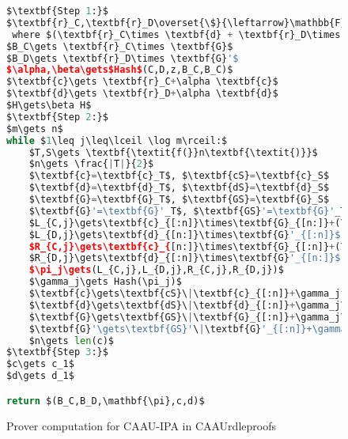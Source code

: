 \begin{figure}[ht]\label{fig:ipa-prover}
\begin{framed}
\begin{lstlisting}[language=Python,mathescape=true,label={lst:ipa-prover}]
$\textbf{Step 1:}$
$\textbf{r}_C,\textbf{r}_D\overset{\$}{\leftarrow}\mathbb{F}^n$
 where $(\textbf{r}_C\times \textbf{d} + \textbf{r}_D\times \textbf{c})=0\text{ and }\textbf{r}_C\times \textbf{r}_D=0$
$B_C\gets \textbf{r}_C\times \textbf{G}$
$B_D\gets \textbf{r}_D\times \textbf{G}'$
$\alpha,\beta\gets$Hash$(C,D,z,B_C,B_C)$
$\textbf{c}\gets \textbf{r}_C+\alpha \textbf{c}$
$\textbf{d}\gets \textbf{r}_D+\alpha \textbf{d}$
$H\gets\beta H$
$\textbf{Step 2:}$
$m\gets n$
while $1\leq j\leq\lceil \log m\rceil:$
    $T,S\gets \textbf{\textit{f(}}n\textbf{\textit{)}}$
    $n\gets \frac{|T|}{2}$
    $\textbf{c}=\textbf{c}_T$, $\textbf{cS}=\textbf{c}_S$
    $\textbf{d}=\textbf{d}_T$, $\textbf{dS}=\textbf{d}_S$
    $\textbf{G}=\textbf{G}_T$, $\textbf{GS}=\textbf{G}_S$
    $\textbf{G}'=\textbf{G}'_T$, $\textbf{GS}'=\textbf{G}'_T$
    $L_{C,j}\gets\textbf{c}_{[:n]}\times\textbf{G}_{[n:]}+(\textbf{c}_{[:n]}\times\textbf{d}_{[n:]})H$
    $L_{D,j}\gets\textbf{d}_{[n:]}\times\textbf{G}'_{[:n]}$
    $R_{C,j}\gets\textbf{c}_{[n:]}\times\textbf{G}_{[:n]}+(\textbf{c}_{[n:]}\times\textbf{d}_{[:n]})H$
    $R_{D,j}\gets\textbf{d}_{[:n]}\times\textbf{G}'_{[n:]}$
    $\pi_j\gets(L_{C,j},L_{D,j},R_{C,j},R_{D,j})$
    $\gamma_j\gets Hash(\pi_j)$
    $\textbf{c}\gets\textbf{cS}\|\textbf{c}_{[:n]}+\gamma_j^{-1}\textbf{c}_{[n:]}$
    $\textbf{d}\gets\textbf{dS}\|\textbf{d}_{[:n]}+\gamma_j\textbf{d}_{[n:]}$
    $\textbf{G}\gets\textbf{GS}\|\textbf{G}_{[:n]}+\gamma_j\textbf{G}_{[n:]}$
    $\textbf{G}'\gets\textbf{GS}'\|\textbf{G}'_{[:n]}+\gamma_j^{-1}\textbf{G}'_{[n:]}$
    $n\gets len(c)$
$\textbf{Step 3:}$
$c\gets c_1$
$d\gets d_1$

return $(B_C,B_D,\mathbf{\pi},c,d)$
\end{lstlisting}
\end{framed}
\caption{Prover computation for CAAU-IPA in CAAUrdleproofs}
\end{figure}

